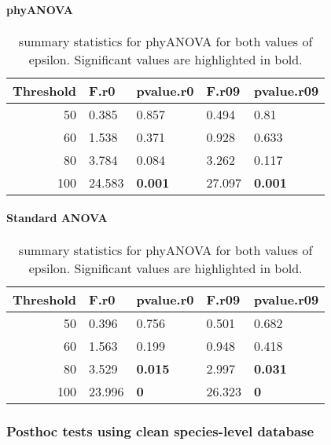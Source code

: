 \documentclass[]{article}
\let\oldparagraph\paragraph
\renewcommand{\paragraph}[1]{\oldparagraph{#1}\mbox{}}
\begin{document}
\hypertarget{phyanova}{%
\paragraph{phyANOVA}\label{phyanova}}

\begin{table}[H]

\caption{\label{tab:unnamed-chunk-4}summary statistics for phyANOVA for both values of epsilon. Significant values are highlighted in bold.}
\centering
\begin{tabular}{r|l|l|l|l}
\hline
Threshold & F.r0 & pvalue.r0 & F.r09 & pvalue.r09\\
\hline
50 & 0.385 & 0.857 & 0.494 & 0.81\\
\hline
60 & 1.538 & 0.371 & 0.928 & 0.633\\
\hline
80 & 3.784 & 0.084 & 3.262 & 0.117\\
\hline
100 & 24.583 & \textbf{0.001} & 27.097 & \textbf{0.001}\\
\hline
\end{tabular}
\end{table}

\hypertarget{standard-anova}{%
\paragraph{Standard ANOVA}\label{standard-anova}}

\begin{table}[H]

\caption{\label{tab:unnamed-chunk-5}summary statistics for phyANOVA for both values of epsilon. Significant values are highlighted in bold.}
\centering
\begin{tabular}{r|l|l|l|l}
\hline
Threshold & F.r0 & pvalue.r0 & F.r09 & pvalue.r09\\
\hline
50 & 0.396 & 0.756 & 0.501 & 0.682\\
\hline
60 & 1.563 & 0.199 & 0.948 & 0.418\\
\hline
80 & 3.529 & \textbf{0.015} & 2.997 & \textbf{0.031}\\
\hline
100 & 23.996 & \textbf{0} & 26.323 & \textbf{0}\\
\hline
\end{tabular}
\end{table}

\hypertarget{posthoc-tests-using-clean-species-level-database}{%
\subsubsection{Posthoc tests using clean species-level
database}\label{posthoc-tests-using-clean-species-level-database}}
\end{document}
